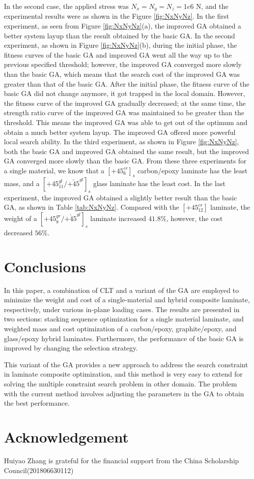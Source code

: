 \documentclass[USenglish,twocolumn]{article}
\begin{document}
In the second case, the applied stress was $N_x=N_y=N_z=1e6$ N, and the experimental results were as
shown in the Figure \ref{fig:NxNyNz}. In the first experiment, as seen from Figure \ref{fig:NxNyNz}(a), the improved GA obtained a
better system layup than the result obtained by the basic GA. In the second experiment, as shown in Figure \ref{fig:NxNyNz}(b), during
the initial phase, the fitness curves of the basic GA and improved GA went all the way up to the
previous specified threshold; however, the improved GA converged more slowly than the basic GA, which
means that the search cost of the improved GA was greater than that of the basic GA. After the initial phase, the fitness
curve of the basic GA did not change anymore, it got trapped in the local domain.
 However, the fitness curve of the
improved GA gradually decreased; at the same time, the strength ratio curve of the improved GA
was maintained to be greater than the threshold. This means the improved GA was able to get out of the optimum
and obtain a much better system layup. The improved GA offered more powerful local search
ability. In the third experiment, as shown in Figure \ref{fig:NxNyNz}, both the basic GA and improved
GA obtained the same result, but the improved GA converged more slowly than the basic GA. From these
three experiments for a single material, we know that a $[\text{+}45_{6}^{cr}]_s$ carbon/epoxy laminate has
the least mass, and a $[\text{+}45_{11}^{gl}/\bar{\text{+}45}^{gl}]_s$ glass laminate has the least
cost. In the last experiment, the improved GA obtained a slightly better result than the basic GA,
as shown in Table \ref{tab:NxNyNz}. Compared with the $[\text{+}45_{12}^{cr}]$ laminate, the
weight of a $[\text{+}45_8^{gr}/\bar{\text{+}45}^{gl}]_s$ laminate increased $41.8\%$, however, the
cost decreased $56\%$.


\section{Conclusions}
In this paper, a combination of CLT and a variant of the GA are employed to minimize the weight and cost
of a single-material and hybrid composite laminate, respectively, under various in-plane loading
cases. The results are presented in two sections: stacking sequence optimization for a single material
laminate, and weighted mass and cost optimization of a carbon/epoxy, graphite/epoxy, and
glass/epoxy hybrid laminates. Furthermore, the performance of the basic GA is improved by changing the
selection strategy.

This variant of the GA provides a new approach to address the search constraint in laminate composite
optimization, and this method is very easy to extend for solving the multiple constraint search problem in other
domain. The problem with the current method involves adjusting the parameters in the GA to obtain the best
performance.

\section{Acknowledgement}
Huiyao Zhang is grateful for the financial support from the China Scholarship Council(201806630112)



\end{document}
